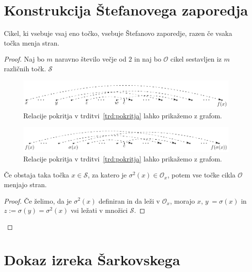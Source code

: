 \documentclass[mat2]{fmfdelo}
\begin{document}
\section{Konstrukcija Štefanovega zaporedja}
\begin{trditev}
Cikel, ki vsebuje vsaj eno točko, vsebuje Štefanovo zaporedje, razen če vsaka točka menja stran.
\end{trditev}
\begin{proof}
Naj bo $m$ naravno število večje od $2$ in naj bo $\mathcal{O}$ cikel sestavljen iz $m$ različnih točk. $\mathcal{S}$ 

\begin{figure}[h]
  \centering
  \includegraphics{images/mnozica_S.pdf}
  \caption[Primer vektorske slike.]{Relacije pokritja v trditvi~\ref{trd:pokritja} lahko prikažemo z grafom.}
  \label{fig:S}
\end{figure}

\begin{figure}[h]
  \centering
  \includegraphics{images/sigma.pdf}
  \caption[Primer vektorske slike.]{Relacije pokritja v trditvi~\ref{trd:pokritja} lahko prikažemo z grafom.}
  \label{fig:sigma}
\end{figure}

\begin{lema}
Če obstaja taka točka $x \in \mathcal{S}$, za katero je $\sigma^2(x) \in \mathcal{O}_x$, potem vse točke cikla $\mathcal{O}$ menjajo stran.
\end{lema}
\begin{proof}
Če želimo, da je $\sigma^2(x)$ definiran in da leži v $\mathcal{O}_x$, morajo $x$, $y \:= \sigma(x)$ in $z := \sigma(y) = \sigma^2(x)$ vsi ležati v množici $\mathcal{S}$.
\end{proof}
\end{proof}
\section{Dokaz izreka Šarkovskega}
\end{document}
